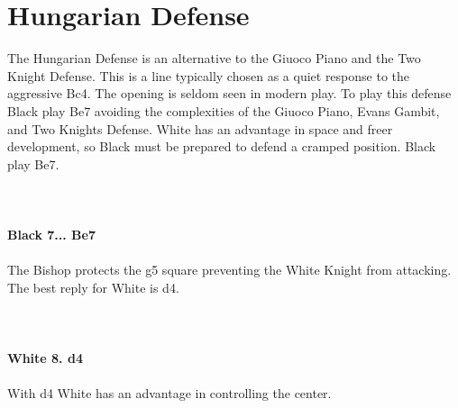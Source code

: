 \documentclass{article}
\begin{document}
\section{ Hungarian Defense}

The Hungarian Defense is an alternative to the Giuoco Piano and the Two Knight Defense. This is a line typically chosen as a quiet response to the aggressive Bc4. The opening is seldom seen in modern play. To play this defense Black play Be7 avoiding the complexities of the Giuoco Piano, Evans Gambit, and Two Knights Defense. White has an advantage in space and freer development, so Black must be prepared to defend a cramped position. Black play Be7.\\
\\

\\
\\
\textbf{Black 7... Be7}\\
\\
The Bishop protects the g5 square preventing the White Knight from attacking. The best reply for White is d4.\\
\\

\\
\\
\textbf{White 8. d4}\\
\\
With d4 White has an advantage in controlling the center.\\
\\
\end{document}
